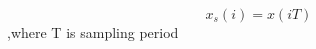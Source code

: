 \documentclass[preview]{standalone}
\begin{document}
\begin{center}
\[ x_s(i) = x(i T)\],where T is sampling period
\end{center}
\end{document}
